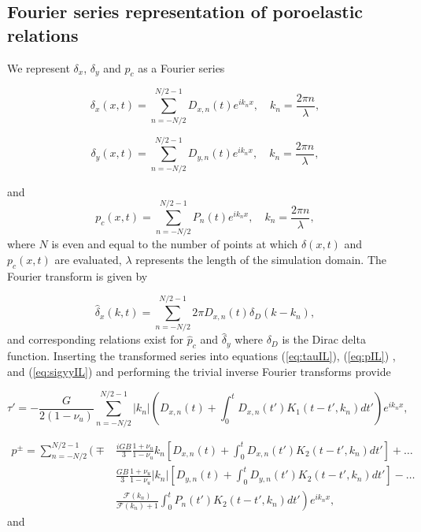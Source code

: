 \documentclass[draft]{agujournal2019}
\begin{document}
\subsection{Fourier series representation of poroelastic relations}	\label{sec:Fser}

We represent $\delta_x$, $\delta_y$ and $p_c$ as a Fourier series

\begin{equation}
    \delta_x (x,t) = \sum_{n = -N/2}^{N/2 - 1} D_{x,n}(t) e^{ik_n x}, \quad k_n = \frac{2 \pi n}{\lambda},
\end{equation}

\begin{equation}
    \delta_y (x,t) = \sum_{n = -N/2}^{N/2 - 1} D_{y,n}(t) e^{ik_n x}, \quad k_n = \frac{2 \pi n}{\lambda},
\end{equation}

and
\begin{equation}
    p_c(x,t) = \sum_{n = -N/2}^{N/2 - 1} P_n(t) e^{ik_n x}, \quad k_n = \frac{2 \pi n}{\lambda},
\end{equation}
where $N$ is even and equal to the number of points at which $\delta(x,t)$ and $p_c(x,t)$ are evaluated, $\lambda$ represents the length of the simulation domain. The Fourier transform is given by 

\begin{equation}
    \hat{\delta}_x(k,t) = \sum_{n = -N/2}^{N/2 - 1} 2 \pi D_{x,n}(t) \delta_D(k - k_n),
\end{equation}
and corresponding relations exist for $\hat{p}_c$ and $\hat{\delta}_y$ where $\delta_D$ is the Dirac delta function. Inserting the transformed series into equations (\ref{eq:tauIL}), (\ref{eq:pIL}) , and (\ref{eq:sigyyIL}) and performing the trivial inverse Fourier transforms provide

\begin{equation}
\tau' = -  \frac{G}{2(1-\nu_u)}  \sum_{n = -N/2}^{N/2 - 1}   |k_n| \left(D_{x,n}(t) + \int_0^t D_{x,n}(t') K_1 (t - t',k_n) dt' \right) e^{ik_n x},
\label{eq:tauS}
\end{equation}	

\begin{align}
p^\pm =   \sum_{n = -N/2}^{N/2 - 1}  \bigg( \mp & \frac{i G B }{3} \frac{1+\nu_u}{1-\nu_u} k_n \left[ D_{x,n}(t) + \int_0^t D_{x,n}(t') K_2 (t - t',k_n) dt' \right] + \ldots \nonumber \\ 
 & \frac{G B }{3} \frac{1+\nu_u}{1-\nu_u} |k_n| \left[ D_{y,n}(t) + \int_0^t D_{y,n}(t') K_2 (t - t',k_n) dt'  \right] - \dots \nonumber  \\ 
& \left. \frac{  \mathcal{F}(k_n) }{\mathcal{F}(k_n) + 1} \int_0^t P_n(t') K_2 (t - t',k_n) dt'    \right) e^{ik_n x} ,
\label{eq:pS}
\end{align}	
and
\end{document}
